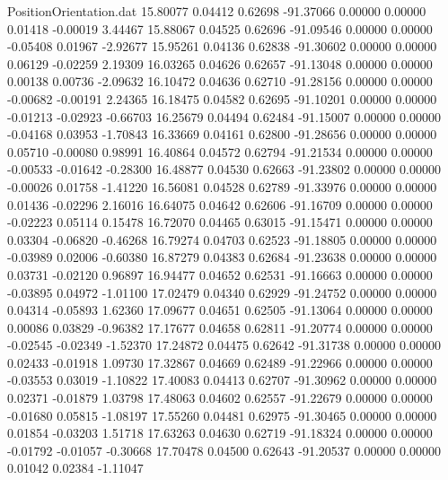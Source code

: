 \begin{filecontents}{PositionOrientation.dat}
  15.80077    0.04412    0.62698   -91.37066    0.00000    0.00000    0.01418   -0.00019    3.44467
  15.88067    0.04525    0.62696   -91.09546    0.00000    0.00000   -0.05408    0.01967   -2.92677
  15.95261    0.04136    0.62838   -91.30602    0.00000    0.00000    0.06129   -0.02259    2.19309
  16.03265    0.04626    0.62657   -91.13048    0.00000    0.00000    0.00138    0.00736   -2.09632
  16.10472    0.04636    0.62710   -91.28156    0.00000    0.00000   -0.00682   -0.00191    2.24365
  16.18475    0.04582    0.62695   -91.10201    0.00000    0.00000   -0.01213   -0.02923   -0.66703
  16.25679    0.04494    0.62484   -91.15007    0.00000    0.00000   -0.04168    0.03953   -1.70843
  16.33669    0.04161    0.62800   -91.28656    0.00000    0.00000    0.05710   -0.00080    0.98991
  16.40864    0.04572    0.62794   -91.21534    0.00000    0.00000   -0.00533   -0.01642   -0.28300
  16.48877    0.04530    0.62663   -91.23802    0.00000    0.00000   -0.00026    0.01758   -1.41220
  16.56081    0.04528    0.62789   -91.33976    0.00000    0.00000    0.01436   -0.02296    2.16016
  16.64075    0.04642    0.62606   -91.16709    0.00000    0.00000   -0.02223    0.05114    0.15478
  16.72070    0.04465    0.63015   -91.15471    0.00000    0.00000    0.03304   -0.06820   -0.46268
  16.79274    0.04703    0.62523   -91.18805    0.00000    0.00000   -0.03989    0.02006   -0.60380
  16.87279    0.04383    0.62684   -91.23638    0.00000    0.00000    0.03731   -0.02120    0.96897
  16.94477    0.04652    0.62531   -91.16663    0.00000    0.00000   -0.03895    0.04972   -1.01100
  17.02479    0.04340    0.62929   -91.24752    0.00000    0.00000    0.04314   -0.05893    1.62360
  17.09677    0.04651    0.62505   -91.13064    0.00000    0.00000    0.00086    0.03829   -0.96382
  17.17677    0.04658    0.62811   -91.20774    0.00000    0.00000   -0.02545   -0.02349   -1.52370
  17.24872    0.04475    0.62642   -91.31738    0.00000    0.00000    0.02433   -0.01918    1.09730
  17.32867    0.04669    0.62489   -91.22966    0.00000    0.00000   -0.03553    0.03019   -1.10822
  17.40083    0.04413    0.62707   -91.30962    0.00000    0.00000    0.02371   -0.01879    1.03798
  17.48063    0.04602    0.62557   -91.22679    0.00000    0.00000   -0.01680    0.05815   -1.08197
  17.55260    0.04481    0.62975   -91.30465    0.00000    0.00000    0.01854   -0.03203    1.51718
  17.63263    0.04630    0.62719   -91.18324    0.00000    0.00000   -0.01792   -0.01057   -0.30668
  17.70478    0.04500    0.62643   -91.20537    0.00000    0.00000    0.01042    0.02384   -1.11047

\end{filecontents}
